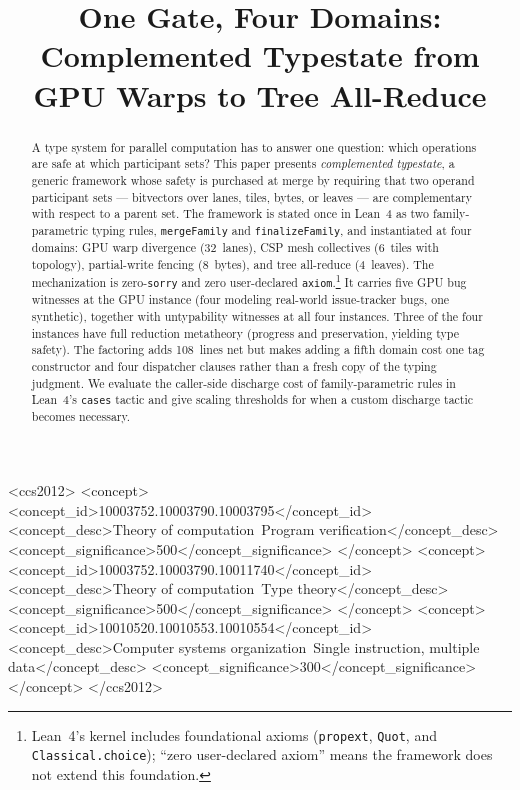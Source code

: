 \documentclass[acmsmall,screen,review,anonymous,nonacm]{acmart}
\title{One Gate, Four Domains: Complemented Typestate from GPU Warps to Tree All-Reduce}
\begin{document}
\begin{abstract}
A type system for parallel computation has to answer one question: which operations are safe at which participant sets? This paper presents \emph{complemented typestate}, a generic framework whose safety is purchased at merge by requiring that two operand participant sets --- bitvectors over lanes, tiles, bytes, or leaves --- are complementary with respect to a parent set. The framework is stated once in Lean~4 as two family-parametric typing rules, \texttt{mergeFamily} and \texttt{finalizeFamily}, and instantiated at four domains: GPU warp divergence (32~lanes), CSP mesh collectives (6~tiles with topology), partial-write fencing (8~bytes), and tree all-reduce (4~leaves). The mechanization is zero-\texttt{sorry} and zero user-declared \texttt{axiom}.\footnote{Lean~4's kernel includes foundational axioms (\texttt{propext}, \texttt{Quot}, and \texttt{Classical.choice}); ``zero user-declared axiom'' means the framework does not extend this foundation.} It carries five GPU bug witnesses at the GPU instance (four modeling real-world issue-tracker bugs, one synthetic), together with untypability witnesses at all four instances. Three of the four instances have full reduction metatheory (progress and preservation, yielding type safety). The factoring adds 108~lines net but makes adding a fifth domain cost one tag constructor and four dispatcher clauses rather than a fresh copy of the typing judgment. We evaluate the caller-side discharge cost of family-parametric rules in Lean~4's \texttt{cases} tactic and give scaling thresholds for when a custom discharge tactic becomes necessary.
\end{abstract}

\begin{CCSXML}
<ccs2012>
  <concept>
    <concept_id>10003752.10003790.10003795</concept_id>
    <concept_desc>Theory of computation~Program verification</concept_desc>
    <concept_significance>500</concept_significance>
  </concept>
  <concept>
    <concept_id>10003752.10003790.10011740</concept_id>
    <concept_desc>Theory of computation~Type theory</concept_desc>
    <concept_significance>500</concept_significance>
  </concept>
  <concept>
    <concept_id>10010520.10010553.10010554</concept_id>
    <concept_desc>Computer systems organization~Single instruction, multiple data</concept_desc>
    <concept_significance>300</concept_significance>
  </concept>
</ccs2012>
\end{CCSXML}

\end{document}

